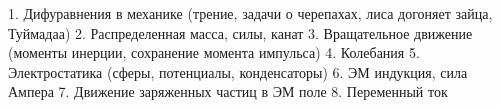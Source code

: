 1. Дифуравнения в механике (трение, задачи о черепахах, лиса догоняет зайца, Туймадаа)
2. Распределенная масса, силы, канат
3. Вращательное движение (моменты инерции, сохранение момента импульса)
4. Колебания
5. Электростатика (сферы, потенциалы, конденсаторы)
6. ЭМ индукция, сила Ампера
7. Движение заряженных частиц в ЭМ поле
8. Переменный ток
